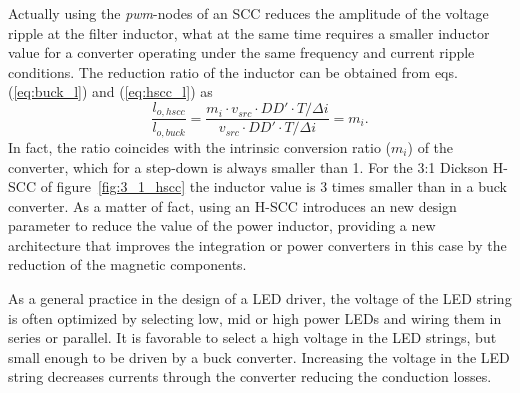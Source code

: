 


Actually using the \emph{pwm}-nodes of an SCC reduces the amplitude of the voltage ripple at the filter inductor, what at the same time requires a smaller inductor value for a converter operating under the same frequency and current ripple conditions. The reduction ratio of the inductor can be obtained from eqs. (\ref{eq:buck_l}) and (\ref{eq:hscc_l}) as
\begin{equation}
 \frac{l_{o,hscc}}{l_{o,buck}} =  \frac{{ m_i \cdot v_{src} \cdot DD' \cdot T}/{\Delta i} }{{  v_{src} \cdot DD' \cdot T}/{\Delta i}} = m_i.
\label{eq:l_m}
\end{equation}
In fact, the ratio coincides with the intrinsic conversion ratio ($m_i$) of the converter, which for a step-down is always smaller than 1. For the 3:1 Dickson H-SCC of figure~\ref{fig:3_1_hscc} the inductor value is 3 times smaller than in a buck converter. As a matter of fact, using an H-SCC introduces an new design parameter to reduce the value of the power inductor, providing a new architecture that improves the integration or power converters in this case by the reduction of the magnetic components.


As a general practice in the design of a LED driver, the voltage of
the LED string is often optimized by selecting low, mid or high
power LEDs and wiring them in series or parallel. It is favorable
to select a high voltage in the LED strings, but small enough to be
driven by a buck converter. Increasing the voltage in the LED
string decreases currents through the converter reducing the
conduction losses.


